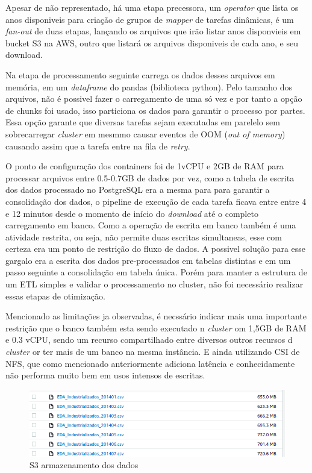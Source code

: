 Apesar de não representado, há uma etapa precessora, um \emph{operator} que lista os anos disponiveis para criação de grupos de \emph{mapper} de tarefas dinâmicas, é um \emph{fan-out} de duas etapas, lançando os arquivos que irão listar anos disponvieis em bucket S3 na AWS, outro que listará os arquivos disponiveis de cada ano, e seu download.

Na etapa de processamento seguinte carrega os dados desses arquivos em memória, em um \emph{dataframe} do {pandas} (biblioteca python). Pelo tamanho dos arquivos, não é possivel fazer o carregamento de uma só vez e por tanto a opção de chunks foi usado, isso particiona os dados para garantir o processo por partes. Essa opção garante que diversas tarefas sejam executadas em parelelo sem sobrecarregar  \emph{cluster} em mesmmo causar eventos de OOM (\emph{out of memory}) causando assim que a tarefa entre na fila de \emph{retry}.

O ponto de configuração dos containers foi de 1vCPU e 2GB de RAM para processar arquivos entre 0.5-0.7GB de dados por vez, como a tabela de escrita dos dados processado no PostgreSQL era a mesma para para garantir a consolidação dos dados, o pipeline de execução de cada tarefa ficava entre entre 4 e 12 minutos desde o momento de início do \emph{download} até o completo carregamento em banco. Como a operação de escrita em banco também é uma atividade restrita, ou seja, não permite duas escritas simultaneas, esse com certeza era um ponto de restrição do fluxo de dados. A possivel solução para esse gargalo era a escrita dos dados pre-processados em tabelas distintas e em um passo seguinte a consolidação em tabela única. Porém para manter a estrutura de um ETL simples e validar o processamento no cluster, não foi necessário realizar essas etapas de otimização. 

Mencionado as limitações ja observadas, é necssário indicar mais uma importante restrição que o banco também esta sendo executado n \emph{cluster} om 1,5GB de RAM e 0.3 vCPU, sendo um recurso compartilhado entre diversos outros recursos d \emph{cluster} or ter mais de um banco na mesma instância. E ainda utilizando CSI de NFS, que como mencionado anteriormente adiciona latência e conhecidamente não performa muito bem em usos intensos de escritas.

\begin{figure}[!ht]
    \centering
    \includegraphics[width=0.8\linewidth]{04-figuras/s3_size.png}
    \caption{S3 armazenamento dos dados}
    \label{fig:s3_storage}
\end{figure}


